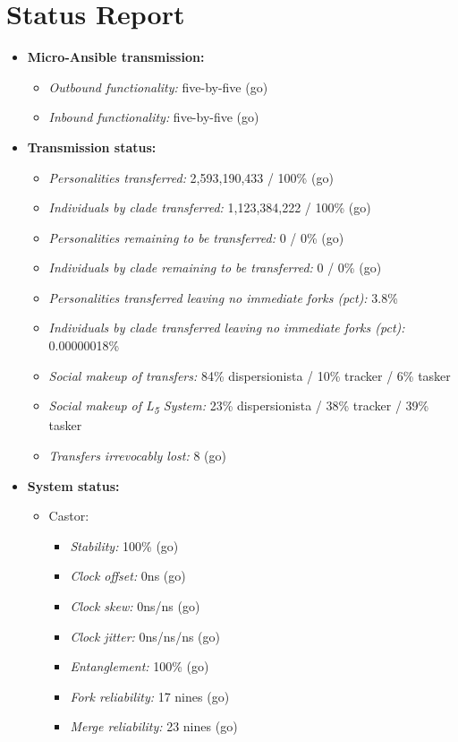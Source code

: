 \hypertarget{status-report}{%
\section*{Status Report}\label{status-report}}

\begin{itemize}
\tightlist
\item
  \textbf{Micro-Ansible transmission:}

  \begin{itemize}
  \tightlist
  \item
    \emph{Outbound functionality:} five-by-five (go)
  \item
    \emph{Inbound functionality:} five-by-five (go)
  \end{itemize}
\item
  \textbf{Transmission status:}

  \begin{itemize}
  \tightlist
  \item
    \emph{Personalities transferred:} 2,593,190,433 / 100\% (go)
  \item
    \emph{Individuals by clade transferred:} 1,123,384,222 / 100\% (go)
  \item
    \emph{Personalities remaining to be transferred:} 0 / 0\% (go)
  \item
    \emph{Individuals by clade remaining to be transferred:} 0 / 0\% (go)
  \item
    \emph{Personalities transferred leaving no immediate forks (pct):} 3.8\%
  \item
    \emph{Individuals by clade transferred leaving no immediate forks (pct):} 0.00000018\%
  \item
    \emph{Social makeup of transfers:} 84\% dispersionista / 10\% tracker / 6\% tasker
  \item
    \emph{Social makeup of L\textsubscript{5} System:} 23\% dispersionista / 38\% tracker / 39\% tasker
  \item
    \emph{Transfers irrevocably lost:} 8 (go)
  \end{itemize}
\item
  \textbf{System status:}

  \begin{itemize}
  \tightlist
  \item
    Castor:

    \begin{itemize}
    \tightlist
    \item
      \emph{Stability:} 100\% (go)
    \item
      \emph{Clock offset:} 0ns (go)
    \item
      \emph{Clock skew:} 0ns/ns (go)
    \item
      \emph{Clock jitter:} 0ns/ns/ns (go)
    \item
      \emph{Entanglement:} 100\% (go)
    \item
      \emph{Fork reliability:} 17 nines (go)
    \item
      \emph{Merge reliability:} 23 nines (go)
    \end{itemize}


\end{itemize}
\end{itemize}
